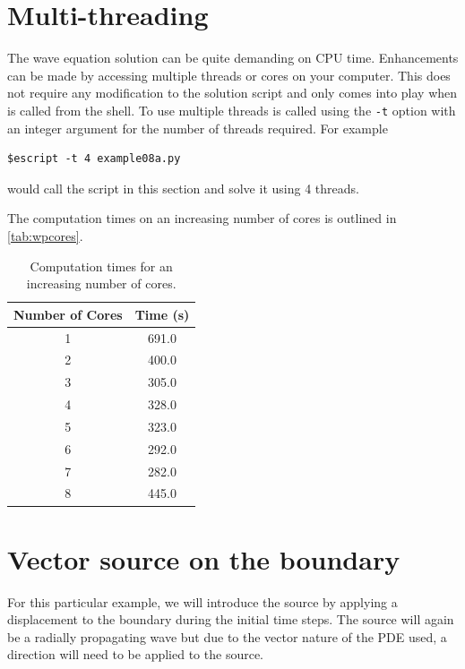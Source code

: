 \section{Multi-threading}
The wave equation solution can be quite demanding on CPU time. Enhancements can
be made by accessing multiple threads or cores on your computer. This does not
require any modification to the solution script and only comes into play when
\esc is called from the shell. To use multiple threads \esc is called using
the \verb!-t! option with an integer argument for the number of threads
required. For example
\begin{verbatim}
$escript -t 4 example08a.py
\end{verbatim}
would call the script in this section and solve it using 4 threads.

The computation times on an increasing number of cores is outlined in
\autoref{tab:wpcores}.

\begin{table}[ht]
\begin{center}
\caption{Computation times for an increasing number of cores.}
\label{tab:wpcores}
\begin{tabular}{| c | c |}
\hline
Number of Cores & Time (s) \\
\hline
1 & 691.0 \\
2 & 400.0 \\
3 & 305.0 \\
4 & 328.0 \\
5 & 323.0 \\
6 & 292.0 \\
7 & 282.0 \\
8 & 445.0 \\ \hline
\end{tabular}
\end{center}
\end{table}

\section{Vector source on the boundary}
For this particular example, we will introduce the source by applying a
displacement to the boundary during the initial time steps. The source will
again be
a radially propagating wave but due to the vector nature of the PDE used, a
direction will need to be applied to the source.

